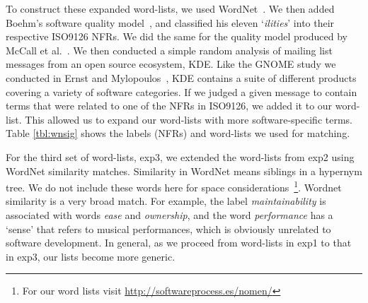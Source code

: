 \documentclass[smallextended]{svjour3}       %
\begin{document}
To construct these expanded word-lists, we used
WordNet~\cite{Fellbaum1998}.
We then added Boehm's software quality model~\cite{Boehm+:1976:ICSE}, and classified his eleven `\emph{ilities}' into their respective ISO9126 NFRs. 
We did the same for the quality model produced by McCall et al.~\cite{mccall1977}. 
We then conducted a simple random analysis of mailing list messages from an open source ecosystem, KDE. Like the GNOME study we conducted in Ernst and Mylopoulos~\cite{ernst10refsq}, KDE contains a suite of different products covering a variety of software categories. If we judged a given message to contain terms that were
related to one of the NFRs in ISO9126, we added it to our word-list. This allowed us to expand our word-lists with more software-specific terms.
Table \ref{tbl:wnsig} shows the labels (NFRs) and word-lists we used for matching.

For the third set of word-lists, \textsf{exp3}, we extended the word-lists from \textsf{exp2} using WordNet similarity matches. 
Similarity in WordNet means siblings in a hypernym tree. 
We do not include these words here for space
considerations~\footnote{For our word lists visit \url{http://softwareprocess.es/nomen/}}. 
Wordnet similarity is a very broad match. For example, the label \emph{maintainability} is associated with
words \emph{ease} and \emph{ownership}, and the word \emph{performance} has a `sense' that refers to musical performances, which is obviously unrelated to software development. In general, as we proceed from word-lists in \textsf{exp1} to that in \textsf{exp3}, our lists become more generic.
\end{document}
